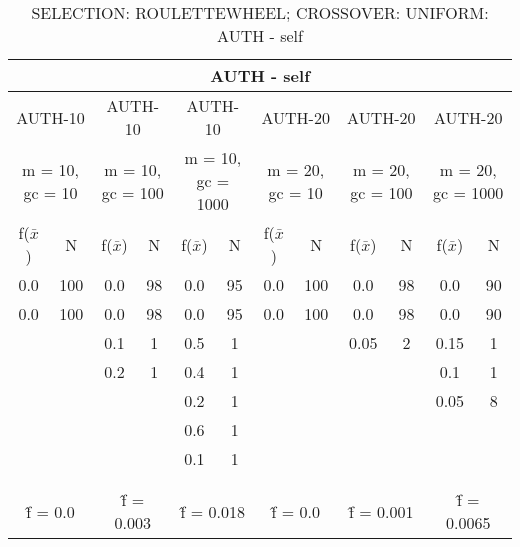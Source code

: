 \begin{table}[H]
	\centering
	\caption{SELECTION: ROULETTEWHEEL; CROSSOVER: UNIFORM: AUTH - self}
	\begin{adjustbox}{width=1\textwidth}
		\begin{tabular}{ |c|c||c|c||c|c||c|c||c|c||c|c| }
			\hline
			\multicolumn{12}{|c|}{AUTH - self} \\
			\hline
			\multicolumn{2}{|c||}{AUTH-10} & \multicolumn{2}{c||}{AUTH-10} & \multicolumn{2}{c||}{AUTH-10} & \multicolumn{2}{c||}{AUTH-20} & \multicolumn{2}{c||}{AUTH-20} & \multicolumn{2}{c|}{AUTH-20}\\
			\hline
			\multicolumn{2}{|c||}{m = 10, gc = 10} & \multicolumn{2}{c||}{m = 10, gc = 100} & \multicolumn{2}{c||}{m = 10, gc = 1000} & \multicolumn{2}{c||}{m = 20, gc = 10} & \multicolumn{2}{c||}{m = 20, gc = 100} & \multicolumn{2}{c|}{m = 20, gc = 1000}\\
			\hline
			f($\bar{x}$) & N & f($\bar{x}$) & N & f($\bar{x}$) & N & f($\bar{x}$) & N & f($\bar{x}$) & N & f($\bar{x}$) & N\\
			\hline
			\hline
			0.0 & 100 & 0.0 & 98 & 0.0 & 95 & 0.0 & 100 & 0.0 & 98 & 0.0 & 90\\
			\hline
			0.0 & 100 & 0.0 & 98 & 0.0 & 95 & 0.0 & 100 & 0.0 & 98 & 0.0 & 90\\
			&   & 0.1 & 1 & 0.5 & 1 &   &   & 0.05 & 2 & 0.15 & 1\\
			&   & 0.2 & 1 & 0.4 & 1 &   &   &   &   & 0.1 & 1\\
			&   &   &   & 0.2 & 1 &   &   &   &   & 0.05 & 8\\
			&   &   &   & 0.6 & 1 &   &   &   &   &   &  \\
			&   &   &   & 0.1 & 1 &   &   &   &   &   &  \\
			&   &   &   &   &   &   &   &   &   &   &  \\
			&   &   &   &   &   &   &   &   &   &   &  \\
			\hline
			\multicolumn{2}{|c||}{\^{f} = 0.0} & \multicolumn{2}{c||}{\^{f} = 0.003} & \multicolumn{2}{c||}{\^{f} = 0.018} & \multicolumn{2}{c||}{\^{f} = 0.0} & \multicolumn{2}{c||}{\^{f} = 0.001} & \multicolumn{2}{c|}{\^{f} = 0.0065}\\
			\hline
		\end{tabular}
	\end{adjustbox}
\end{table}
